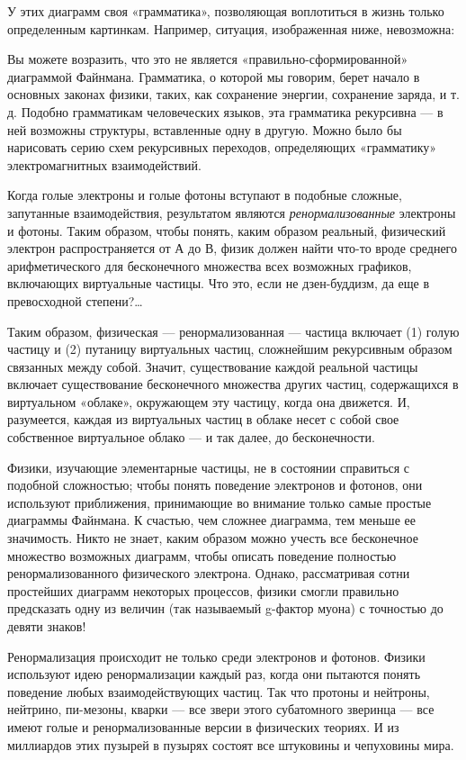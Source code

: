 У этих диаграмм своя «грамматика», позволяющая воплотиться в жизнь только определенным картинкам. Например, ситуация, изображенная ниже, невозможна:

Вы можете возразить, что это не является «правильно-сформированной» диаграммой Файнмана. Грамматика, о которой мы говорим, берет начало в основных законах физики, таких, как сохранение энергии, сохранение заряда, и т. д. Подобно грамматикам человеческих языков, эта грамматика рекурсивна --- в ней возможны структуры, вставленные одну в другую. Можно было бы нарисовать серию схем рекурсивных переходов, определяющих «грамматику» электромагнитных взаимодействий.

Когда голые электроны и голые фотоны вступают в подобные сложные, запутанные взаимодействия, результатом являются \emph{ренормализованные} электроны и фотоны. Таким образом, чтобы понять, каким образом реальный, физический электрон распространяется от А до В, физик должен найти что-то вроде среднего арифметического для бесконечного множества всех возможных графиков, включающих виртуальные частицы. Что это, если не дзен-буддизм, да еще в превосходной степени?\ldots{}

Таким образом, физическая --- ренормализованная --- частица включает (1) голую частицу и (2) путаницу виртуальных частиц, сложнейшим рекурсивным образом связанных между собой. Значит, существование каждой реальной частицы включает существование бесконечного множества других частиц, содержащихся в виртуальном «облаке», окружающем эту частицу, когда она движется. И, разумеется, каждая из виртуальных частиц в облаке несет с собой свое собственное виртуальное облако --- и так далее, до бесконечности.

Физики, изучающие элементарные частицы, не в состоянии справиться с подобной сложностью; чтобы понять поведение электронов и фотонов, они используют приближения, принимающие во внимание только самые простые диаграммы Файнмана. К счастью, чем сложнее диаграмма, тем меньше ее значимость. Никто не знает, каким образом можно учесть все бесконечное множество возможных диаграмм, чтобы описать поведение полностью ренормализованного физического электрона. Однако, рассматривая сотни простейших диаграмм некоторых процессов, физики смогли правильно предсказать одну из величин (так называемый g-фактор муона) с точностью до девяти знаков!

Ренормализация происходит не только среди электронов и фотонов. Физики используют идею ренормализации каждый раз, когда они пытаются понять поведение любых взаимодействующих частиц. Так что протоны и нейтроны, нейтрино, пи-мезоны, кварки --- все звери этого субатомного зверинца --- все имеют голые и ренормализованные версии в физических теориях. И из миллиардов этих пузырей в пузырях состоят все штуковины и чепуховины мира.

